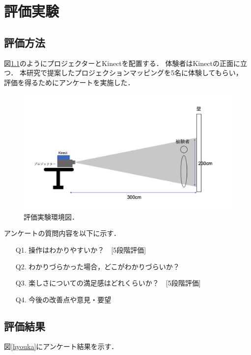 \chapter{評価実験}
\thispagestyle{fancy}


\section{評価方法}
図\ref{kankyou}のようにプロジェクターとKinectを配置する．
体験者はKinectの正面に立つ．
本研究で提案したプロジェクションマッピングを5名に体験してもらい，
評価を得るためにアンケートを実施した．

\vspace{1cm}
\begin{figure}[h]
  \centering
  \includegraphics[width=14cm]{image/jikkenkankyou.png}
  \caption[評価実験環境図]{評価実験環境図．}
\label{kankyou}
\end{figure}


\clearpage

アンケートの質問内容を以下に示す．
\begin{itemize}
  \item[Q1.] 操作はわかりやすいか？　[5段階評価]
  \item[Q2.] わかりづらかった場合，どこがわかりづらいか？ 
  \item[Q3.] 楽しさについての満足感はどれくらいか？　[5段階評価]
  \item[Q4.] 今後の改善点や意見・要望   
\end{itemize}



\section{評価結果}
図\ref{hyouka}にアンケート結果を示す．

